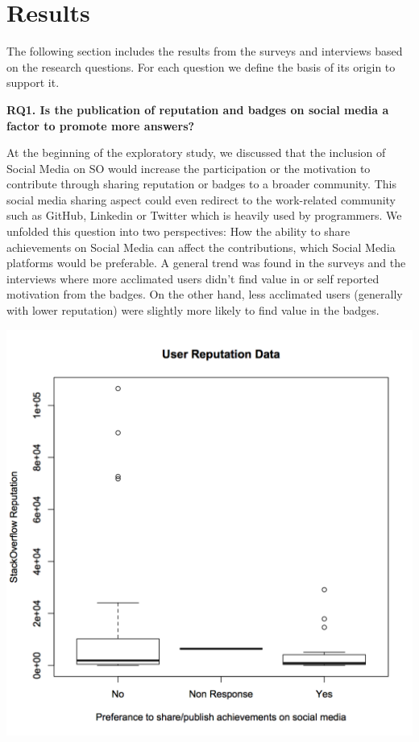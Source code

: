 \documentclass{sigchi}
\begin{document}
\section{Results}

The following section includes the results from the surveys and interviews based on the research questions. For each question we define the basis of its origin to support it.

\textbf{RQ1. Is the publication of reputation and badges on social media a factor to promote more answers?}

At the beginning of the exploratory study, we discussed that the inclusion of Social Media on SO would increase the participation or the motivation to contribute through sharing reputation or badges to a broader community. This social media sharing aspect could even redirect to the work-related community such as GitHub, Linkedin or Twitter which is heavily used by programmers. We unfolded this question into two perspectives: How the ability to share achievements on Social Media can affect the contributions,  which Social Media platforms would be preferable. A general trend was found in the surveys and the interviews where more acclimated users didn't find value in or self reported motivation from the badges. On the other hand, less acclimated users (generally with lower reputation) were slightly more likely to find value in the badges. 

\includegraphics[scale=0.5]{figures/boxplot_reputation_compare_publish_reputation_bool.png} 
\end{document}
